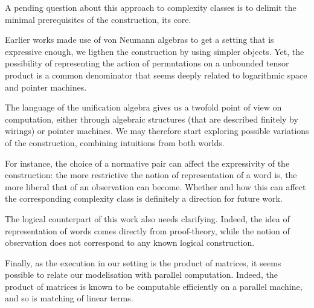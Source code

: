 A pending question about this approach to complexity classes is to delimit the minimal prerequisites of the construction, its core.

Earlier works \cite{girard_normativity_2012,aubert_characterizing_2012,seiller_logarithmic_2013} made use of von Neumann algebras to get a setting that is expressive enough, we ligthen the construction by using simpler objects.
Yet, the possibility of representing the action of permutations on a unbounded tensor product is a common denominator that seems deeply related to logarithmic space and pointer machines.

\smallskip
The language of the unification algebra gives us a twofold point of view on computation, either through algebraic structures (that are described finitely by wirings) or pointer machines.
We may therefore start exploring possible variations of the construction, combining intuitions from both worlds.

\smallskip
For instance, the choice of a normative pair can affect the expressivity of the construction:
the more restrictive the notion of representation of a word is, the more liberal that of an observation can become.
Whether and how this can affect the corresponding complexity class is definitely a direction for future work.

\smallskip
The logical counterpart of this work also needs clarifying.
Indeed, the idea of representation of words comes directly from proof-theory, while the notion of observation does not correspond to any known logical construction.

\smallskip
Finally, as the execution in our setting is the product of matrices, it seems possible to relate our modelisation with parallel computation. Indeed, the product of matrices is known to be computable efficiently on a parallel machine, and so is matching of linear terms.
